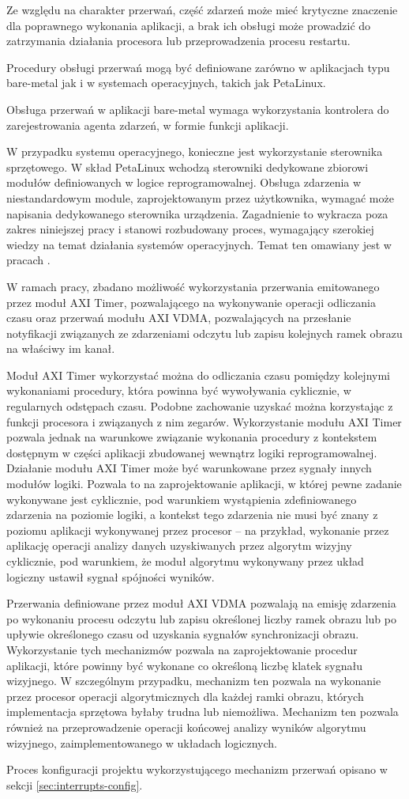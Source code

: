 Ze względu na charakter przerwań, część zdarzeń może mieć krytyczne znaczenie dla poprawnego wykonania aplikacji, a brak ich obsługi może prowadzić do zatrzymania działania procesora lub przeprowadzenia procesu restartu.

Procedury obsługi przerwań mogą być definiowane zarówno w aplikacjach typu bare-metal jak i w systemach operacyjnych, takich jak PetaLinux.

Obsługa przerwań w aplikacji bare-metal wymaga wykorzystania kontrolera do zarejestrowania agenta zdarzeń, w formie funkcji aplikacji.

W przypadku systemu operacyjnego, konieczne jest wykorzystanie sterownika sprzętowego. W skład PetaLinux wchodzą sterowniki dedykowane zbiorowi modułów definiowanych w logice reprogramowalnej. Obsługa zdarzenia w niestandardowym module, zaprojektowanym przez użytkownika, wymagać może napisania dedykowanego sterownika urządzenia. Zagadnienie to wykracza poza zakres niniejszej pracy i stanowi rozbudowany proces, wymagający szerokiej wiedzy na temat działania systemów operacyjnych. Temat ten omawiany jest w pracach \cite{Love2014,Corbet2005}.

W ramach pracy, zbadano możliwość wykorzystania przerwania emitowanego przez moduł AXI Timer, pozwalającego na wykonywanie operacji odliczania czasu oraz przerwań modułu AXI VDMA, pozwalających na przesłanie notyfikacji związanych ze zdarzeniami odczytu lub zapisu kolejnych ramek obrazu na właściwy im kanał.

Moduł AXI Timer wykorzystać można do odliczania czasu pomiędzy kolejnymi wykonaniami procedury, która powinna być wywoływania cyklicznie, w regularnych odstępach czasu. Podobne zachowanie uzyskać można korzystając z funkcji procesora i związanych z nim zegarów. Wykorzystanie modułu AXI Timer pozwala jednak na warunkowe związanie wykonania procedury z kontekstem dostępnym w części aplikacji zbudowanej wewnątrz logiki reprogramowalnej. Działanie modułu AXI Timer może być warunkowane przez sygnały innych modułów logiki. Pozwala to na zaprojektowanie aplikacji, w której pewne zadanie wykonywane jest cyklicznie, pod warunkiem wystąpienia zdefiniowanego zdarzenia na poziomie logiki, a kontekst tego zdarzenia nie musi być znany z poziomu aplikacji wykonywanej przez procesor -- na przykład, wykonanie przez aplikację operacji analizy danych uzyskiwanych przez algorytm wizyjny cyklicznie, pod warunkiem, że moduł algorytmu wykonywany przez układ logiczny ustawił sygnał spójności wyników.

Przerwania definiowane przez moduł AXI VDMA pozwalają na emisję zdarzenia po wykonaniu procesu odczytu lub zapisu określonej liczby ramek obrazu lub po upływie określonego czasu od uzyskania sygnałów synchronizacji obrazu. Wykorzystanie tych mechanizmów pozwala na zaprojektowanie procedur aplikacji, które powinny być wykonane co określoną liczbę klatek sygnału wizyjnego. W szczególnym przypadku, mechanizm ten pozwala na wykonanie przez procesor operacji algorytmicznych dla każdej ramki obrazu, których implementacja sprzętowa byłaby trudna lub niemożliwa. Mechanizm ten pozwala również na przeprowadzenie operacji końcowej analizy wyników algorytmu wizyjnego, zaimplementowanego w układach logicznych.

Proces konfiguracji projektu wykorzystującego mechanizm przerwań opisano w sekcji \ref{sec:interrupts-config}.